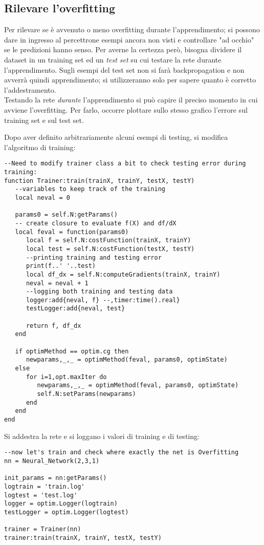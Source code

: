 \subsection{Rilevare l'overfitting}
Per rilevare se è avvenuto o meno overfitting durante l'apprendimento; si possono dare in ingresso al percettrone esempi ancora non visti e controllare "ad occhio" se le predizioni hanno senso. Per averne la certezza però, bisogna dividere il dataset in un training set ed un \emph{test set} su cui testare la rete durante l'apprendimento. Sugli esempi del test set non si farà backpropagation e non avverrà quindi apprendimento; si utilizzeranno solo per sapere quanto è corretto l'addestramento. \\
Testando la rete \emph{durante} l'apprendimento si può capire il preciso momento in cui avviene l'overfitting. Per farlo, occorre plottare sullo stesso grafico l'errore sul training set e sul test set. 

Dopo aver definito arbitrariamente alcuni esempi di testing, si modifica l'algoritmo di training: 
\begin{lstlisting}[language={[5.2]Lua}]
--Need to modify trainer class a bit to check testing error during training:
function Trainer:train(trainX, trainY, testX, testY)
   --variables to keep track of the training
   local neval = 0

   params0 = self.N:getParams()
   -- create closure to evaluate f(X) and df/dX
   local feval = function(params0)
      local f = self.N:costFunction(trainX, trainY)
      local test = self.N:costFunction(testX, testY)
      --printing training and testing error
      print(f..' '..test)
      local df_dx = self.N:computeGradients(trainX, trainY)
      neval = neval + 1
      --logging both training and testing data
      logger:add{neval, f} --,timer:time().real}
      testLogger:add{neval, test}

      return f, df_dx
   end

   if optimMethod == optim.cg then
      newparams,_,_ = optimMethod(feval, params0, optimState)
   else
      for i=1,opt.maxIter do
         newparams,_,_ = optimMethod(feval, params0, optimState)
         self.N:setParams(newparams)
      end
   end
end
\end{lstlisting}

Si addestra la rete e si loggano i valori di training e di testing: 
\begin{lstlisting}[language={[5.2]Lua}]
--now let's train and check where exactly the net is Overfitting
nn = Neural_Network(2,3,1)

init_params = nn:getParams()
logtrain = 'train.log'
logtest = 'test.log'
logger = optim.Logger(logtrain)
testLogger = optim.Logger(logtest)

trainer = Trainer(nn)
trainer:train(trainX, trainY, testX, testY)
\end{lstlisting}

